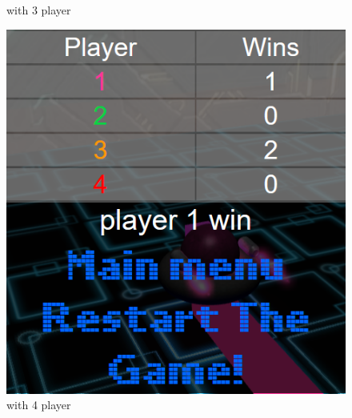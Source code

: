 \documentclass[11pt]{article}
\begin{document}
\begin{figure}
\begin{minipage}[b]{0.3015\linewidth}
		\caption{with 3 player}
		\label{fig:endGameMenu3}
	\end{minipage}
	\begin{minipage}[b]{0.2955\linewidth}
		\includegraphics[width=\linewidth]{endGameMenu4}
		\caption{with 4 player}
		\label{fig:endGameMenu4}
	\end{minipage}
\end{figure}
\end{document}
